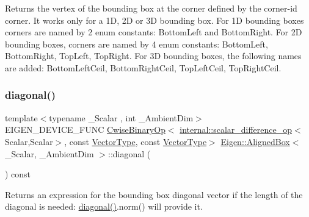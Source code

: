 \begin{DoxyReturn}{Returns}
the vertex of the bounding box at the corner defined by the corner-\/id corner. It works only for a 1D, 2D or 3D bounding box. For 1D bounding boxes corners are named by 2 enum constants\+: Bottom\+Left and Bottom\+Right. For 2D bounding boxes, corners are named by 4 enum constants\+: Bottom\+Left, Bottom\+Right, Top\+Left, Top\+Right. For 3D bounding boxes, the following names are added\+: Bottom\+Left\+Ceil, Bottom\+Right\+Ceil, Top\+Left\+Ceil, Top\+Right\+Ceil. 
\end{DoxyReturn}
\mbox{\label{class_eigen_1_1_aligned_box_a37ff7dfbe2d9aff6920c7f92b02af8d4}} 
\subsubsection{\texorpdfstring{diagonal()}{diagonal()}}
{\footnotesize\ttfamily template$<$typename \+\_\+\+Scalar , int \+\_\+\+Ambient\+Dim$>$ \\
E\+I\+G\+E\+N\+\_\+\+D\+E\+V\+I\+C\+E\+\_\+\+F\+U\+NC \mbox{\hyperlink{class_eigen_1_1_cwise_binary_op}{Cwise\+Binary\+Op}}$<$ \mbox{\hyperlink{struct_eigen_1_1internal_1_1scalar__difference__op}{internal\+::scalar\+\_\+difference\+\_\+op}}$<$Scalar,Scalar$>$, const \mbox{\hyperlink{class_eigen_1_1_matrix}{Vector\+Type}}, const \mbox{\hyperlink{class_eigen_1_1_matrix}{Vector\+Type}}$>$ \mbox{\hyperlink{class_eigen_1_1_aligned_box}{Eigen\+::\+Aligned\+Box}}$<$ \+\_\+\+Scalar, \+\_\+\+Ambient\+Dim $>$\+::diagonal (\begin{DoxyParamCaption}{ }\end{DoxyParamCaption}) const\hspace{0.3cm}{\ttfamily [inline]}}

\begin{DoxyReturn}{Returns}
an expression for the bounding box diagonal vector if the length of the diagonal is needed\+: \mbox{\hyperlink{class_eigen_1_1_aligned_box_a37ff7dfbe2d9aff6920c7f92b02af8d4}{diagonal()}}.norm() will provide it. 
\end{DoxyReturn}
\mbox{\label{class_eigen_1_1_aligned_box_ab774df3608d0be913a3aa5d67476a521}} 
